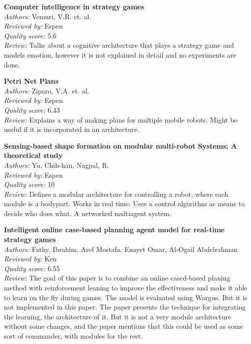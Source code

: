 \textbf{Computer intelligence in strategy games}\\
\textit{Authors:} Vemuri, V.R. et. al.\\
\textit{Reviewed by:} Espen\\
\textit{Quality score:} 5.6\\
\textit{Review:} Talks about a cognitive architecture that plays a strategy game and models emotion, however it is not explained in detail and no experiments are done.

\textbf{Petri Net Plans}\\
\textit{Authors:} Ziparo, V.A. et. al.\\
\textit{Reviewed by:} Espen\\
\textit{Quality score:} 6.43\\
\textit{Review:} Explains a way of making plans for multiple mobile robots. Might be useful if it is incorporated in an architecture.

\textbf{Sensing-based shape formation on modular multi-robot Systems: A theoretical study}\\
\textit{Authors:} Yu, Chih-han, Nagpal, R.	\\
\textit{Reviewed by:} Espen\\
\textit{Quality score:} 10\\
\textit{Review:} Defines a modular architecture for controlling a robot, where each module is a bodypart. Works in real time. Uses a control algorithm as means to decide who does what. A networked multiagent system.

\textbf{Intelligent online case-based planning agent model for real-time strategy games}\\
\textit{Authors:} Fathy, Ibrahim, Aref Mostafa, Enayet Omar, Al-Ogail Abdelrahman	\\
\textit{Reviewed by:} Ken\\
\textit{Quality score:} 6.55\\
\textit{Review:} The goal of this paper is to combine an online cased-based planing method with reinforcement leaning to improve the effectiveness and make it able to learn on the fly during games. The model is evaluated using Wargus. But it is not implemented in this paper. The paper presents the technique for integrating the learning, the architecture of it. But it is not a  very module architecture without some changes, and the paper mentions that this could be used as some sort of commander, with modules for the rest.


